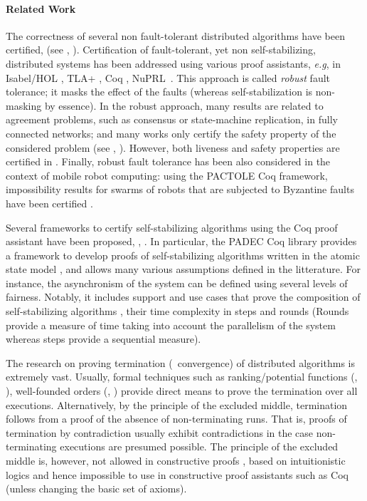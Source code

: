 \paragraph{Related Work}

The correctness of several non fault-tolerant distributed algorithms
have been certified, (see \eg, \cite{CF11j,HESSELINK20131622}).
Certification of fault-tolerant, yet non self-stabilizing, distributed
systems has been addressed using various proof assistants, {\em e.g},
in Isabel/HOL \cite{CM09j,JM05tr,berni,KNR12}, TLA+
\cite{CDLMRV12c,DFGL13c}, Coq \cite{RVVV18c}, NuPRL~\cite{RGBC17j}.
This approach is called {\em robust} fault tolerance; it masks the
effect of the faults (whereas self-stabilization is non-masking by
essence). In the robust approach, many results are related to
agreement problems, such as consensus or state-machine replication, in
fully connected networks; and many works only certify the safety
property of the considered
problem (see \eg, \cite{CDLMRV12c,DFGL13c,RGBC17j,RVVV18c}).
However, both liveness and safety properties are certified
in \cite{CM09j,KNR12,berni}.
Finally, robust fault tolerance has been also considered in the
context of mobile robot computing: using the PACTOLE Coq framework,
impossibility results for swarms of robots that are subjected to
Byzantine faults have been certified \cite{bouzid13sss,CRTU15}.


Several frameworks to certify self-stabilizing algorithms using the
Coq proof assistant have been proposed, \eg, \cite{Courtieu02,ACD7}.
In particular, the PADEC Coq library provides a framework to develop
proofs of self-stabilizing algorithms written in the atomic state
model \cite{D74j}, and allows many various assumptions defined in
the litterature. For instance, the asynchronism of the system can be
defined using several levels of fairness.
Notably, it includes support and use cases that prove the composition
of self-stabilizing algorithms \cite{DBLP:conf/forte/AltisenCD19},
their time complexity in steps \cite{ACD21c} and
rounds \cite{AltisenCD23} (Rounds provide a measure of time taking
into account the parallelism of the system whereas steps provide a
sequential measure).

The research on proving termination (\ie\ convergence) of distributed
algorithms is extremely vast. Usually, formal techniques such as
ranking/potential functions (\eg, \cite{ACD21c}), well-founded orders
(\eg, \cite{ACD7}) provide direct means to prove the termination
over all executions.  Alternatively, by the principle of the excluded
middle, termination follows from a proof of the absence of
non-terminating runs.  That is, proofs of termination by contradiction
usually exhibit contradictions in the case non-terminating executions
are presumed possible.  The principle of the excluded middle is,
however, not allowed in constructive proofs \eg, based on
intuitionistic logics and hence impossible to use in constructive
proof assistants such as Coq \cite{coqart}
(unless changing the basic set of axioms).

